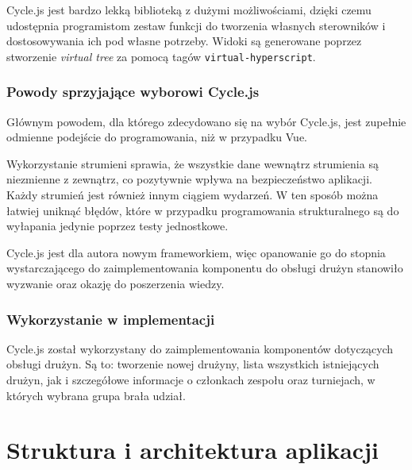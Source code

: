 \documentclass[shortabstract]{iithesis}
\theoremstyle{definition} \newtheorem{definition}{Definicja}[]
\theoremstyle{remark} \newtheorem{remark}[definition]{Observation}
\theoremstyle{plain} \newtheorem{theorem}[definition]{Theorem}
\theoremstyle{plain} \newtheorem{lemma}[definition]{Lemma}
\begin{document}
Cycle.js jest bardzo lekką biblioteką z dużymi możliwościami, dzięki czemu udostępnia programistom zestaw funkcji do tworzenia własnych sterowników i dostosowywania ich pod własne potrzeby. Widoki są generowane poprzez stworzenie \textit{virtual tree} za pomocą tagów \texttt{virtual-hyperscript}.

\subsection{Powody sprzyjające wyborowi Cycle.js}
Głównym powodem, dla którego zdecydowano się na wybór Cycle.js, jest zupełnie odmienne podejście do programowania, niż w przypadku Vue.

Wykorzystanie strumieni sprawia, że wszystkie dane wewnątrz strumienia są niezmienne z zewnątrz, co pozytywnie wpływa na bezpieczeństwo aplikacji. Każdy strumień jest również innym ciągiem wydarzeń. W ten sposób można łatwiej uniknąć błędów, które w przypadku programowania strukturalnego są do wyłapania jedynie poprzez testy jednostkowe.

Cycle.js jest dla autora nowym frameworkiem, więc opanowanie go do stopnia wystarczającego do zaimplementowania komponentu do obsługi drużyn stanowiło wyzwanie oraz okazję do poszerzenia wiedzy.

\subsection{Wykorzystanie w implementacji}
Cycle.js został wykorzystany do zaimplementowania komponentów dotyczących obsługi drużyn. Są to: tworzenie nowej drużyny, lista wszystkich istniejących drużyn, jak i szczegółowe informacje o członkach zespołu oraz turniejach, w których wybrana grupa brała udział.


\chapter{Struktura i architektura aplikacji}
\end{document}
